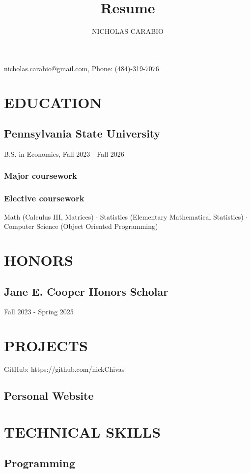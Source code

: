 \documentclass{article}
\makeatletter
\renewcommand{\maketitle}{
\begin{center}
{\huge\bfseries\theauthor}

\vspace{.25em}

nicholas.carabio@gmail.com, Phone: (484)-319-7076

\end{center}
}
\makeatother
\begin{document}
\title{Resume}
\author{NICHOLAS CARABIO}

\maketitle

\section{EDUCATION}

\subsection{\bf{Pennsylvania State University}}
B.S. in Economics, Fall 2023 - Fall 2026

\subsubsection{Major coursework}
\subsubsection{Elective coursework}
Math (Calculus III, Matrices) $\cdot$ Statistics (Elementary Mathematical Statistics) $\cdot$ Computer Science (Object Oriented Programming)

\section{HONORS}
\subsection{Jane E. Cooper Honors Scholar}
Fall 2023 - Spring 2025

\section{PROJECTS}
GitHub: https://github.com/nickChivas

\subsection{Personal Website}

\section{TECHNICAL SKILLS}  

\subsection{Programming}
\end{document}
